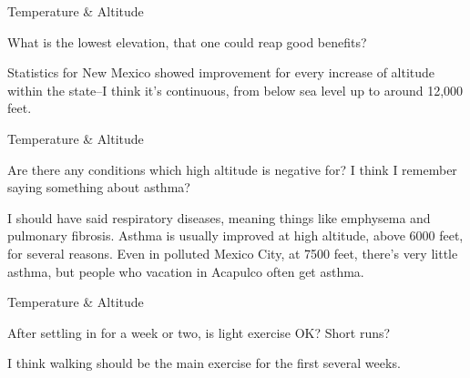 \documentclass[11pt,oneside,openany,extrafontsizes]{memoir}
\begin{document}
\begin{qaexchange}{Temperature \& Altitude}

    \begin{question}
        What is the lowest elevation, that one could reap good benefits?
    \end{question}

    \begin{answer}
        Statistics for New Mexico showed improvement for every increase of altitude within the state--I think it's continuous, from below sea level up to around 12,000 feet.
    \end{answer}
\end{qaexchange}

\begin{qaexchange}{Temperature \& Altitude}

    \begin{question}
        Are there any conditions which high altitude is negative for? I think I remember saying something about asthma?
    \end{question}

    \begin{answer}
        I should have said respiratory diseases, meaning things like emphysema and pulmonary fibrosis. Asthma is usually improved at high altitude, above 6000 feet, for several reasons. Even in polluted Mexico City, at 7500 feet, there's very little asthma, but people who vacation in Acapulco often get asthma.
    \end{answer}
\end{qaexchange}

\begin{qaexchange}{Temperature \& Altitude}

    \begin{question}
        After settling in for a week or two, is light exercise OK? Short runs?
    \end{question}

    \begin{answer}
        I think walking should be the main exercise for the first several weeks.
    \end{answer}
\end{qaexchange}
\end{document}
